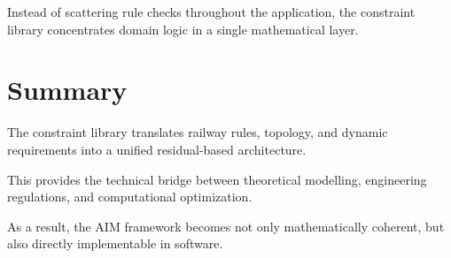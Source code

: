 Instead of scattering rule checks throughout the application, the
constraint library concentrates domain logic in a single mathematical
layer.

\section{Summary}

\begin{summary}
The constraint library translates railway rules, topology, and dynamic
requirements into a unified residual-based architecture.

This provides the technical bridge between theoretical modelling,
engineering regulations, and computational optimization.

As a result, the AIM framework becomes not only mathematically coherent,
but also directly implementable in software.
\end{summary}
